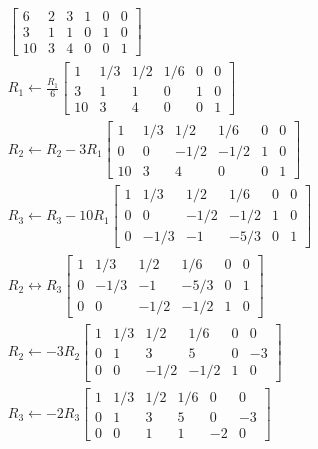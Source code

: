 \documentclass[12pt, border = 4pt, multi]{article} %
\begin{document}
\begin{align*}
\left[
\begin{array}{ccc|ccc}
6 & 2 & 3 & 1 & 0 & 0\\
3 & 1 & 1 & 0 & 1 & 0\\
10 & 3 & 4 & 0 & 0 & 1
\end{array}
\right]\\
R_1 \leftarrow \frac{R_1}{6}
\left[
\begin{array}{ccc|ccc}
1 & 1 / 3 & 1 / 2 & 1 / 6 & 0 & 0\\
3 & 1 & 1 & 0 & 1 & 0\\
10 & 3 & 4 & 0 & 0 & 1
\end{array}
\right]\\
R_2 \leftarrow R_2 - 3 R_1
\left[
\begin{array}{ccc|ccc}
1 & 1 / 3 & 1 / 2 & 1 / 6 & 0 & 0\\
0 & 0 & - 1 / 2 & - 1 / 2 & 1 & 0\\
10 & 3 & 4 & 0 & 0 & 1
\end{array}
\right]\\
R_3 \leftarrow R_3 - 10 R_1
\left[
\begin{array}{ccc|ccc}
1 & 1 / 3 & 1 / 2 & 1 / 6 & 0 & 0\\
0 & 0 & - 1 / 2 & - 1 / 2 & 1 & 0\\
0 & - 1 / 3 & -1 & - 5 / 3 & 0 & 1
\end{array}
\right]\\
R_2 \leftrightarrow R_3
\left[
\begin{array}{ccc|ccc}
1 & 1 / 3 & 1 / 2 & 1 / 6 & 0 & 0\\
0 & - 1 / 3 & -1 & - 5 / 3 & 0 & 1\\
0 & 0 & - 1 / 2 & - 1 / 2 & 1 & 0
\end{array}
\right]\\
R_2 \leftarrow -3 R_2
\left[
\begin{array}{ccc|ccc}
1 & 1 / 3 & 1 / 2 & 1 / 6 & 0 & 0\\
0 & 1 & 3 & 5 & 0 & -3\\
0 & 0 & - 1 / 2 & - 1 / 2 & 1 & 0
\end{array}
\right]\\
R_3 \leftarrow -2 R_3
\left[
\begin{array}{ccc|ccc}
1 & 1 / 3 & 1 / 2 & 1 / 6 & 0 & 0\\
0 & 1 & 3 & 5 & 0 & -3\\
0 & 0 & 1 & 1 & -2 & 0
\end{array}
\right]\\

\end{align*}
\end{document}
